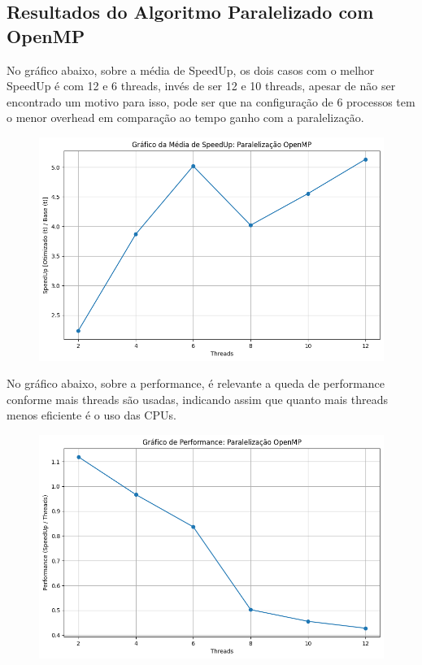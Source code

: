 \subsection{Resultados do Algoritmo Paralelizado com OpenMP}

No gráfico abaixo, sobre a média de SpeedUp, os dois casos com o melhor SpeedUp é com 12 e 6 threads, invés de ser 12 e 10 threads, apesar de não ser encontrado um motivo para isso, pode ser que na configuração de 6 processos tem o menor overhead em comparação ao tempo ganho com a paralelização.

\begin{figure}[H]
    \centering
    \includegraphics[width=1\linewidth]{../assets/OMP - SpeedUp.png}
\end{figure}

No gráfico abaixo, sobre a performance, é relevante a queda de performance conforme mais threads são usadas, indicando assim que quanto mais threads menos eficiente é o uso das CPUs.

\begin{figure}[H]
    \centering
    \includegraphics[width=1\linewidth]{../assets/OMP - Performance.png}
\end{figure}

